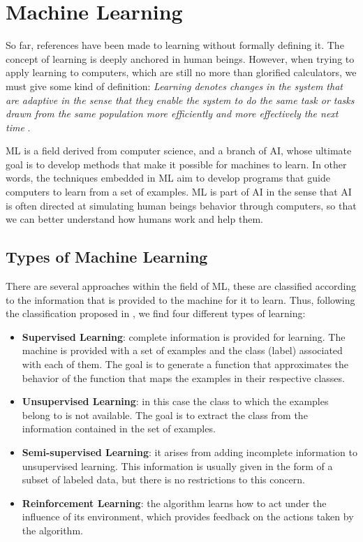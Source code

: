\section{Machine Learning}

So far, references have been made to learning without formally defining it. The concept of learning is deeply anchored in human beings. However, when trying to apply learning to computers, which are still no more than glorified calculators, we must give some kind of definition: \textit{Learning denotes changes in the system that are adaptive in the sense that they enable the system to do the same task or tasks drawn from the same population more efficiently and more effectively the next time} \cite{Michalski:2013:MLA:2588013}.

\acs{ML} is a field derived from computer science, and a branch of \acf{AI}, whose ultimate goal is to develop methods that make it possible for machines to learn. In other words, the techniques embedded in \acs{ML} aim to develop programs that guide computers to learn from a set of examples. \acs{ML} is part of \acs{AI} in the sense that \acs{AI} is often directed at simulating human beings behavior through computers, so that we can better understand how humans work and help them.

\subsection{Types of Machine Learning}

There are several approaches within the field of \acf{ML}, these are classified according to the information that is provided to the machine for it to learn. Thus, following the classification proposed in \cite{ayodele2010types}, we find four different types of learning:

\begin{itemize}
	
	\item \textbf{Supervised Learning}: complete information is provided for learning. The machine is provided with a set of examples and the class (label) associated with each of them. The goal is to generate a function that approximates the behavior of the function that maps the examples in their respective classes.
	
	\item \textbf{Unsupervised Learning}: in this case the class to which the examples belong to is not available. The goal is to extract the class from the information contained in the set of examples.
	
	\item \textbf{Semi-supervised Learning}: it arises from adding incomplete information to unsupervised learning. This information is usually given in the form of a subset of labeled data, but there is no restrictions to this concern.
	
	\item \textbf{Reinforcement Learning}: the algorithm learns how to act under the influence of its environment, which provides feedback on the actions taken by the algorithm.
	
\end{itemize}

